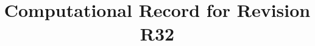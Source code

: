 
\begin{frontmatter}
\title{Computational Record for Revision R32}
\begin{aug}\author[id=au1,addressref={add1}]{~}\address[id=add1]{}\end{aug}
\end{frontmatter}


